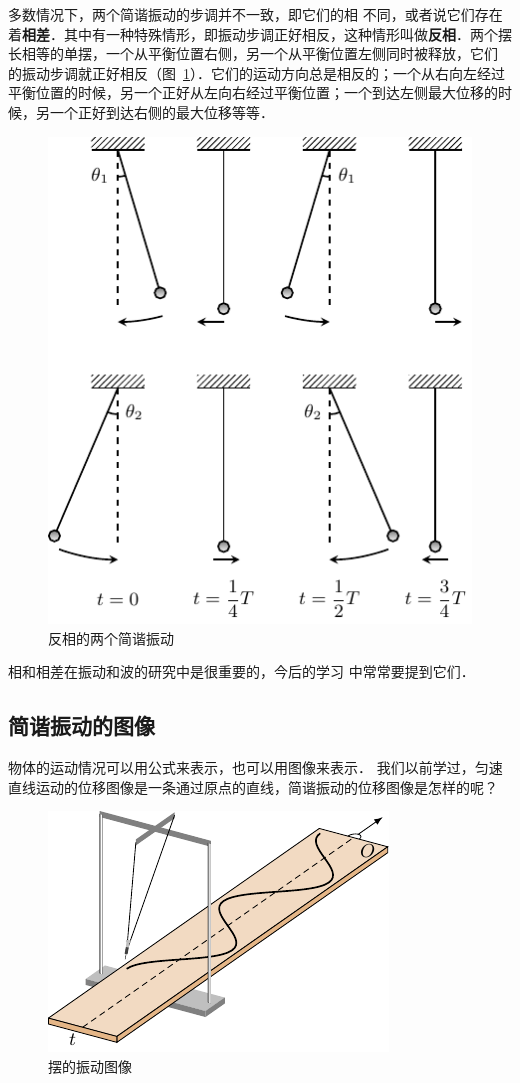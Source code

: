 多数情况下，两个简谐振动的步调并不一致，即它们的相
不同，或者说它们存在着\textbf{相差}．其中有一种特殊情形，即振动步调正好相反，这种情形叫做\textbf{反相}．两个摆长相等的单摆，一个从平衡位置右侧，另一个从平衡位置左侧同时被释放，它们
的振动步调就正好相反（图~\ref{fig_A_9-5}）．它们的运动方向总是相反的；一个从右向左经过平衡位置的时候，另一个正好从左向右经过平衡位置；一个到达左侧最大位移的时候，另一个正好到达右侧的最大位移等等．
\begin{figure}[htbp]
    \centering
    \includegraphics{fig/A/9-5.pdf}
    \caption{反相的两个简谐振动}\label{fig_A_9-5}
\end{figure}

相和相差在振动和波的研究中是很重要的，今后的学习
中常常要提到它们．

\subsection{简谐振动的图像}
物体的运动情况可以用公式来表示，也可以用图像来表示．
我们以前学过，匀速直线运动的位移图像是一条通过原点的直线，简谐振动的位移图像是怎样的呢？
\begin{figure}[htbp]
    \centering
    \includegraphics{fig/A/9-6.pdf}
    \caption{摆的振动图像}\label{fig_A_9-6}
\end{figure}


